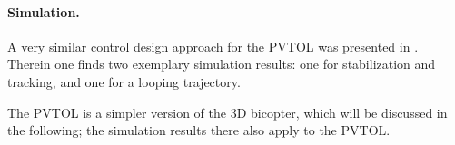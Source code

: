 \paragraph{Simulation.}
A very similar control design approach for the PVTOL was presented in \cite{Konz:AT}.
Therein one finds two exemplary simulation results: one for stabilization and tracking, and one for a looping trajectory. 

The PVTOL is a simpler version of the 3D bicopter, which will be discussed in the following; the simulation results there also apply to the PVTOL.



